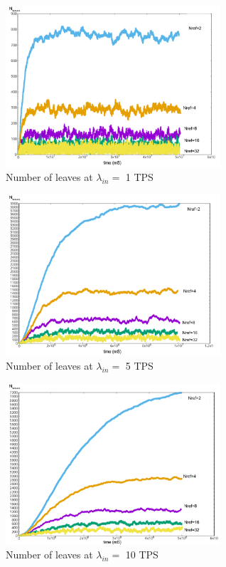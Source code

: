 \documentclass[a4paper,10pt,twocolumn]{article}
\begin{document}
 \begin{figure}[ht]
	\begin{center}
	\includegraphics[width=80mm]{1sec.png}
	  \caption{Number of leaves at \( \lambda_{in}=\) 1 TPS}
	\label{fig:sec1}
	\end{center}
 \end{figure}

 \begin{figure}[ht]
	\begin{center}
	\includegraphics[width=80mm]{5sec.png}
	  \caption{Number of leaves at \( \lambda_{in}=\) 5 TPS}
	\label{fig:sec5}
	\end{center}
 \end{figure}

 \begin{figure}[ht]
	\begin{center}
	\includegraphics[width=80mm]{10sec.png}
	  \caption{Number of leaves at \( \lambda_{in}=\) 10 TPS}
	\label{fig:sec10}
	\end{center}
 \end{figure}
\end{document}

